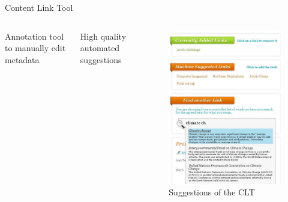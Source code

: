 \documentclass[10pt]{beamer}
\begin{document}
\begin{frame}[fragile]{Content Link Tool}

  \begin{columns}[T,onlytextwidth]

      \bigskip
      Annotation tool to manually edit metadata

      \bigskip
      High quality automated suggestions

      \begin{figure}
        \centering
          \includegraphics[width=.9\textwidth]{img/content_link_tool}
        \caption{Suggestions of the CLT}
      \end{figure}

  \end{columns}
\end{frame}








\end{document}
